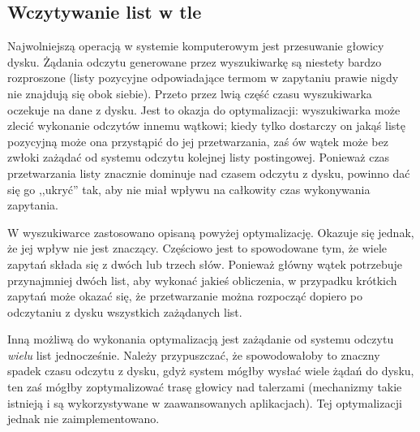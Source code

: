 \documentclass[a4paper,12pt]{article}
\begin{document}
\subsection{Wczytywanie list w tle}
Najwolniejszą operacją w systemie komputerowym jest przesuwanie głowicy
dysku. Żądania odczytu generowane przez wyszukiwarkę są niestety bardzo
rozproszone (listy pozycyjne odpowiadające termom w zapytaniu prawie
nigdy nie znajdują się obok siebie). Przeto przez lwią część czasu
wyszukiwarka oczekuje na dane z dysku. Jest to okazja do optymalizacji:
wyszukiwarka może zlecić wykonanie odczytów innemu wątkowi; kiedy tylko
dostarczy on jakąś listę pozycyjną może ona przystąpić do jej przetwarzania,
zaś ów wątek może bez zwłoki zażądać od systemu odczytu kolejnej listy
postingowej. Ponieważ czas przetwarzania listy znacznie dominuje nad czasem
odczytu z dysku, powinno dać się go ,,ukryć'' tak, aby nie miał wpływu na
całkowity czas wykonywania zapytania.

W wyszukiwarce zastosowano opisaną powyżej optymalizację. Okazuje się jednak,
że jej wpływ nie jest znaczący. Częściowo jest to spowodowane tym, że wiele
zapytań składa się z dwóch lub trzech słów. Ponieważ główny wątek potrzebuje
przynajmniej dwóch list, aby wykonać jakieś obliczenia, w przypadku krótkich
zapytań może okazać się, że przetwarzanie można rozpocząć dopiero po odczytaniu
z dysku wszystkich zażądanych list.

Inną możliwą do wykonania optymalizacją jest zażądanie od systemu odczytu
\textit{wielu} list jednocześnie. Należy przypuszczać, że spowodowałoby
to znaczny spadek czasu odczytu z dysku, gdyż system mógłby wysłać wiele
żądań do dysku, ten zaś mógłby zoptymalizować trasę głowicy nad talerzami
(mechanizmy takie istnieją i są wykorzystywane w zaawansowanych aplikacjach).
Tej optymalizacji jednak nie zaimplementowano.
\end{document}
